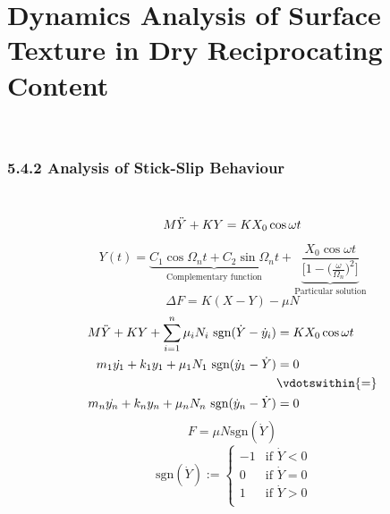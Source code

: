 
\chapter{Dynamics Analysis of Surface Texture in Dry Reciprocating Content}
\HRule \\[-0.5cm] %

\label{Chapter5} %


\newpage

\subsection*{5.4.2 \quad Analysis of Stick-Slip Behaviour}
\setcounter{equation}{15}~\cite{mishra2018lp}
\begin{equation}
    M\Ddot{Y}+KY=KX_{0}\cos \omega t
\end{equation}

\begin{equation}
    Y(t)=\underbrace{ C_{1}\cos \Omega_{n}t + C_{2}\sin \Omega_{n}t} _\text{Complementary function}+ \underbrace{\frac{X_{0} \cos \omega t}{\Bigg[1-\bigg(\frac{\omega}{\Omega_{n}}\bigg)^{2}\Bigg]}}_\text{Particular solution}
\end{equation}
\begin{equation}
    \Delta F=K(X-Y)-\mu N
\end{equation}
\setcounter{equation}{0}
\begin{equation}
\begin{aligned}
     M\Ddot{Y}+KY + \sum_{i=1}^{n}\mu_{i}N_{i}~\mbox{sgn}(\dot Y-\dot y_{i})&=KX_{0}\cos \omega t\\
     m_{1}\Dot{y_{1}}+k_{1}y_{1}+\mu_{1}N_{1} ~\mbox{sgn}(\dot y_{1}-\dot Y)&= 0\\
                                                                    &\vdotswithin{=}\\
     m_{n}\Dot{y_{n}}+k_{n}y_{n}+\mu_{n}N_{n} ~\mbox{sgn}(\dot y_{n}-\dot Y)&= 0
     \end{aligned}
\end{equation}
\begin{equation}
F=\mu N \mbox{sgn}(\dot Y)
\end{equation}
\begin{equation}
    ~\mbox{sgn}(\dot Y):= 
    \begin{cases}
    -1 &\text{if $\dot Y < 0$}\\
    0 &\text{if $\dot Y = 0$}\\
    1 &\text{if $\dot Y > 0$}\\
\end{cases}
\end{equation}

